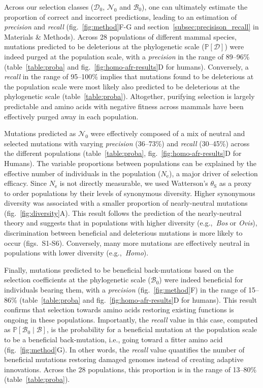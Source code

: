 \documentclass{article}
\newcommand{\Ne}{N_{\text{e}}}
\newcommand{\proba}{\mathbb{P}}
\newcommand{\SphyDel}{\mathcal{D}_0}
\newcommand{\SphyNeu}{\mathcal{N}_0}
\newcommand{\SphyBen}{\mathcal{B}_0}
\newcommand{\given}{\mid}
\newcommand{\SpopDel}{\mathcal{D}}
\newcommand{\SpopBen}{\mathcal{B}}
\newcommand{\ProbaPopDel}{\proba [ \SpopDel]}
\newcommand{\thetaSyn}{\theta_{\text{S}}}
\begin{document}
    Across our selection classes ($\SphyDel$, $\SphyNeu$ and $\SphyBen$), one can ultimately estimate the proportion of correct and incorrect predictions, leading to an estimation of \textit{precision} and \textit{recall} (fig.~\ref{fig:method}F-G and section~\ref{subsec:precisison_recall} in Materials \& Methods).
    Across 28 populations of different mammal species, mutations predicted to be deleterious at the phylogenetic scale ($\ProbaPopDel$) were indeed purged at the population scale, with a \textit{precision} in the range of 89--96\% (table~\ref{table:proba} and fig.~\ref{fig:homo-afr-results}D for humans).
    Conversely, a \textit{recall} in the range of 95--100\% implies that mutations found to be deleterious at the population scale were most likely also predicted to be deleterious at the phylogenetic scale (table~\ref{table:proba}).
    Altogether, purifying selection is largely predictable and amino acids with negative fitness across mammals have been effectively purged away in each population.

    Mutations predicted as $\SphyNeu$ were effectively composed of a mix of neutral and selected mutations with varying \textit{precision} (36--73\%) and \textit{recall} (30--45\%) across the different populations (table~\ref{table:proba}, fig.~\ref{fig:homo-afr-results}D for Humans).
    The variable proportions between populations can be explained by the effective number of individuals in the population ($\Ne$), a major driver of selection efficacy.
    Since $\Ne$ is not directly measurable, we used Watterson's $\thetaSyn$ as a proxy to order populations by their levels of synonymous diversity.
    Higher synonymous diversity was associated with a smaller proportion of nearly-neutral mutations (fig.~\ref{fig:diversity}A).
    This result follows the prediction of the nearly-neutral theory and suggests that in populations with higher diversity (e.g.,~\textit{Bos} or \textit{Ovis}), discrimination between beneficial and deleterious mutations is more likely to occur (figs.~S1-S6).
    Conversely, many more mutations are effectively neutral in populations with lower diversity (e.g.,~\textit{Homo}).

    Finally, mutations predicted to be beneficial back-mutations based on the selection coefficients at the phylogenetic scale ($\SphyBen$) were indeed beneficial for individuals bearing them, with a \textit{precision} (fig.~\ref{fig:method}F) in the range of 15--86\% (table~\ref{table:proba} and fig.~\ref{fig:homo-afr-results}D for humans).
    This result confirms that selection towards amino acids restoring existing functions is ongoing in these populations.
    Importantly, the \textit{recall} value in this case, computed as $\proba [ \SphyBen  \given  \SpopBen]$, is the probability for a beneficial mutation at the population scale to be a beneficial back-mutation, i.e., going toward a fitter amino acid (fig.~\ref{fig:method}G).
    In other words, the \textit{recall} value quantifies the number of beneficial mutations restoring damaged genomes instead of creating adaptive innovations.
    Across the 28 populations, this proportion is in the range of 13--80\% (table~\ref{table:proba}).
\end{document}
